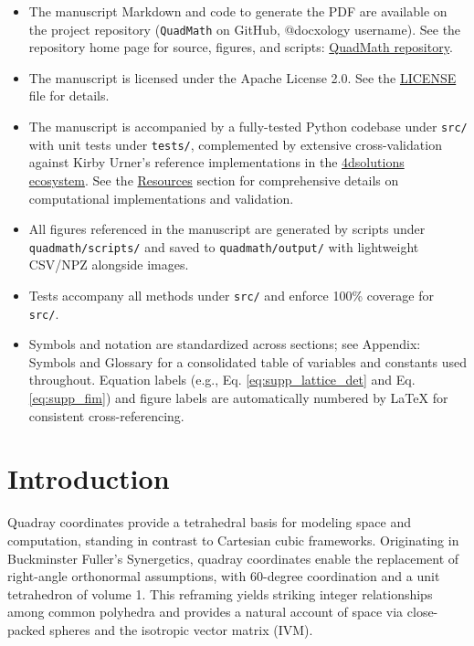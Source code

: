 \documentclass[
  10pt,
]{article}
\newcommand{\passthrough}[1]{#1}
\providecommand{\tightlist}{%
  \setlength{\itemsep}{0pt}\setlength{\parskip}{0pt}}
\begin{document}
\begin{itemize}
\tightlist
\item
  The manuscript Markdown and code to generate the PDF are available on
  the project repository (\passthrough{\lstinline!QuadMath!} on GitHub,
  @docxology username). See the repository home page for source,
  figures, and scripts:
  \href{https://github.com/docxology/quadmath}{QuadMath repository}.
\item
  The manuscript is licensed under the Apache License 2.0. See the
  \href{../LICENSE}{LICENSE} file for details.
\item
  The manuscript is accompanied by a fully-tested Python codebase under
  \passthrough{\lstinline!src/!} with unit tests under
  \passthrough{\lstinline!tests/!}, complemented by extensive
  cross-validation against Kirby Urner's reference implementations in
  the \href{https://github.com/4dsolutions}{4dsolutions ecosystem}. See
  the \href{07_resources.md}{Resources} section for comprehensive
  details on computational implementations and validation.
\item
  All figures referenced in the manuscript are generated by scripts
  under \passthrough{\lstinline!quadmath/scripts/!} and saved to
  \passthrough{\lstinline!quadmath/output/!} with lightweight CSV/NPZ
  alongside images.
\item
  Tests accompany all methods under \passthrough{\lstinline!src/!} and
  enforce 100\% coverage for \passthrough{\lstinline!src/!}.
\item
  Symbols and notation are standardized across sections; see Appendix:
  Symbols and Glossary for a consolidated table of variables and
  constants used throughout. Equation labels (e.g., Eq.
  \eqref{eq:supp_lattice_det} and Eq. \eqref{eq:supp_fim}) and figure
  labels are automatically numbered by LaTeX for consistent
  cross-referencing.
\end{itemize}

\newpage

\hypertarget{introduction}{%
\section{Introduction}\label{introduction}}

Quadray coordinates provide a tetrahedral basis for modeling space and
computation, standing in contrast to Cartesian cubic frameworks.
Originating in Buckminster Fuller's Synergetics, quadray coordinates
enable the replacement of right-angle orthonormal assumptions, with
60-degree coordination and a unit tetrahedron of volume 1. This
reframing yields striking integer relationships among common polyhedra
and provides a natural account of space via close-packed spheres and the
isotropic vector matrix (IVM).
\end{document}

